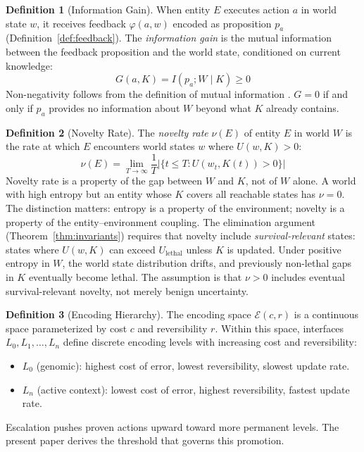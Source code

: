 \documentclass[11pt]{article}
\theoremstyle{definition}
\newtheorem{definition}{Definition}
\theoremstyle{remark}
\begin{document}
\begin{definition}[Information Gain]
\label{def:gain}
When entity $E$ executes action $a$ in world state $w$, it receives
feedback $\varphi(a, w)$ encoded as proposition $p_a$
(Definition~\ref{def:feedback}). The \emph{information gain} is the
mutual information between the feedback proposition and the world
state, conditioned on current knowledge:
\[
G(a, K) = I(p_a; W \mid K) \geq 0
\]
Non-negativity follows from the definition of mutual information
\cite{Cover2006}. $G = 0$ if and only if $p_a$ provides no
information about $W$ beyond what $K$ already contains.
\end{definition}

\begin{definition}[Novelty Rate]
\label{def:novelty}
The \emph{novelty rate} $\nu(E)$ of entity $E$ in world $W$ is the rate
at which $E$ encounters world states $w$ where $U(w, K) > 0$:
\[
\nu(E) = \lim_{T \to \infty} \frac{1}{T}
\bigl|\{t \leq T : U(w_t, K(t)) > 0\}\bigr|
\]
Novelty rate is a property of the gap between $W$ and $K$, not of $W$
alone. A world with high entropy but an entity whose $K$ covers all
reachable states has $\nu = 0$. The distinction matters: entropy is
a property of the environment; novelty is a property of the
entity--environment coupling. The elimination argument
(Theorem~\ref{thm:invariants}) requires that novelty include
\emph{survival-relevant} states: states where $U(w, K)$ can exceed
$U_{\mathrm{lethal}}$ unless $K$ is updated. Under positive entropy in
$W$, the world state distribution drifts, and previously non-lethal gaps
in $K$ eventually become lethal. The assumption is that $\nu > 0$
includes eventual survival-relevant novelty, not merely benign
uncertainty.
\end{definition}

\begin{definition}[Encoding Hierarchy]
\label{def:hierarchy}
The encoding space $\mathcal{E}(c, r)$ is a continuous space
parameterized by cost $c$ and reversibility $r$. Within this space,
interfaces $L_0, L_1, \ldots, L_n$ define discrete encoding levels
with increasing cost and reversibility:
\begin{itemize}
\item $L_0$ (genomic): highest cost of error, lowest reversibility,
   slowest update rate.
\item $L_n$ (active context): lowest cost of error, highest
   reversibility, fastest update rate.
\end{itemize}
Escalation \cite{McCarthy2026b} pushes proven actions
upward toward more permanent levels. The present paper derives the
threshold that governs this promotion.
\end{definition}
\end{document}
